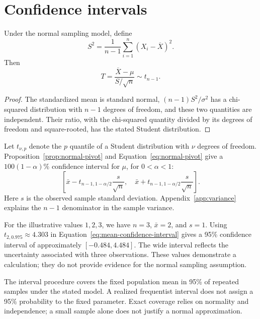 \section{Confidence intervals}
\begin{prop}
  \label{prop:normal-pivot}
  Under the normal sampling model, define
  \[
    S^2 = \frac{1}{n-1}\sum_{i=1}^{n}(X_i-\overline{X})^2.
  \]
  Then
  \begin{equation}
    \label{eq:normal-pivot}
    T = \frac{\overline{X}-\mu}{S/\sqrt{n}}\sim t_{n-1}.
  \end{equation}
\end{prop}
\begin{proof}
  The standardized mean is standard normal, $(n-1)S^2/\sigma^2$ has a
  chi-squared distribution with $n-1$ degrees of freedom, and these two
  quantities are independent. Their ratio, with the chi-squared quantity
  divided by its degrees of freedom and square-rooted, has the stated
  Student distribution.
\end{proof}
Let $t_{\nu,p}$ denote the $p$ quantile of a Student distribution with $\nu$
degrees of freedom. Proposition~\ref{prop:normal-pivot} and
Equation~\eqref{eq:normal-pivot} give a $100(1-\alpha)\%$ confidence interval
for $\mu$, for $0<\alpha<1$:
\begin{equation}
  \label{eq:mean-confidence-interval}
  \left[\bar{x}-t_{n-1,1-\alpha/2}\frac{s}{\sqrt{n}},\quad
        \bar{x}+t_{n-1,1-\alpha/2}\frac{s}{\sqrt{n}}\right].
\end{equation}
Here $s$ is the observed sample standard deviation. Appendix~\ref{app:variance}
explains the $n-1$ denominator in the sample variance.


For the illustrative values $1,2,3$, we have $n=3$, $\bar{x}=2$, and $s=1$.
Using $t_{2,0.975}\approx 4.303$ in
Equation~\eqref{eq:mean-confidence-interval} gives a 95\% confidence interval
of approximately $[-0.484,4.484]$. The wide interval reflects the uncertainty
associated with three observations. These values demonstrate a calculation;
they do not provide evidence for the normal sampling assumption.


\begin{remark}[Coverage]
  The interval procedure covers the fixed population mean in 95\% of repeated
  samples under the stated model. A realized frequentist interval does not
  assign a 95\% probability to the fixed parameter. Exact coverage relies on
  normality and independence; a small sample alone does not justify a normal
  approximation.
\end{remark}


